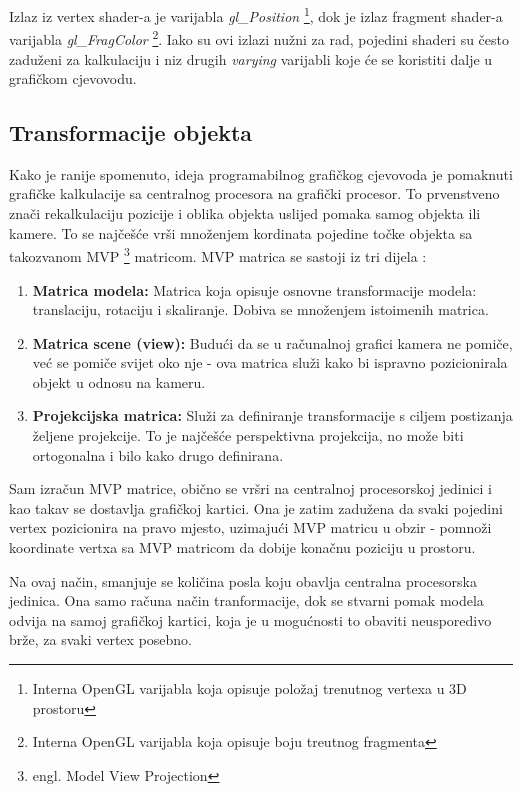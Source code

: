 Izlaz iz vertex shader-a je varijabla \emph{gl\_Position} \footnote{Interna OpenGL varijabla koja opisuje položaj trenutnog vertexa u 3D prostoru}, dok je izlaz fragment shader-a varijabla \emph{gl\_FragColor} \footnote{Interna OpenGL varijabla koja opisuje boju treutnog fragmenta}. Iako su ovi izlazi nužni za rad, pojedini shaderi su često zaduženi za kalkulaciju i niz drugih \emph{varying} varijabli koje će se koristiti dalje u grafičkom cjevovodu.

\subsection{Transformacije objekta}

Kako je ranije spomenuto, ideja programabilnog grafičkog cjevovoda je pomaknuti grafičke kalkulacije sa centralnog procesora na grafički procesor. To prvenstveno znači rekalkulaciju pozicije i oblika objekta uslijed pomaka samog objekta ili kamere. To se najčešće vrši množenjem kordinata pojedine točke objekta sa takozvanom MVP \footnote{engl. Model View Projection} matricom. MVP matrica se sastoji iz tri dijela \cite{opengl-es-mvp}:

\begin{enumerate}
\item \textbf{Matrica modela:} Matrica koja opisuje osnovne transformacije modela: translaciju, rotaciju i skaliranje. Dobiva se množenjem istoimenih matrica.

\item \textbf{Matrica scene (view):} Budući da se u računalnoj grafici kamera ne pomiče, već se pomiče svijet oko nje - ova matrica služi kako bi ispravno pozicionirala objekt u odnosu na kameru.

\item \textbf{Projekcijska matrica:} Služi za definiranje transformacije s ciljem postizanja željene projekcije. To je najčešće perspektivna projekcija, no može biti ortogonalna i bilo kako drugo definirana.
\end{enumerate}

Sam izračun MVP matrice, obično se vršri na centralnoj procesorskoj jedinici i kao takav se dostavlja grafičkoj kartici. Ona je zatim zadužena da svaki pojedini vertex pozicionira na pravo mjesto, uzimajući MVP matricu u obzir - pomnoži koordinate vertxa sa MVP matricom da dobije konačnu poziciju u prostoru.

Na ovaj način, smanjuje se količina posla koju obavlja centralna procesorska jedinica. Ona samo računa način tranformacije, dok se stvarni pomak modela odvija na samoj grafičkoj kartici, koja je u mogućnosti to obaviti neusporedivo brže, za svaki vertex posebno.

